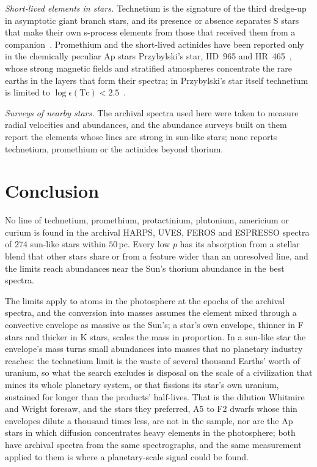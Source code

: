 \documentclass[3p,11pt]{elsarticle}
\begin{document}
\emph{Short-lived elements in stars.} Technetium is the signature of the third dredge-up
in asymptotic giant branch stars, and its presence or absence separates S stars that
make their own s-process elements from those that received them from a
companion~\cite{Merrill1952,VanEckJorissen1999}. Promethium and the short-lived actinides
have been reported only in the chemically peculiar Ap stars Przybylski's star, HD~965 and
HR~465~\cite{Cowley2004,Fivet2007,Gopka2008}, whose strong magnetic fields and
stratified atmospheres concentrate the rare earths in the layers that form their spectra;
in Przybylski's star itself technetium is limited to
$\log\epsilon(\mathrm{Tc})<2.5$~\cite{Andrievsky2023}.

\emph{Surveys of nearby stars.} The archival spectra used here were taken to measure
radial velocities and abundances, and the abundance surveys built on them report the
elements whose lines are strong in sun-like stars; none reports technetium, promethium
or the actinides beyond thorium.

\section{Conclusion}\label{sec:conclusion}

No line of technetium, promethium, protactinium, plutonium, americium or curium is found
in the archival HARPS, UVES, FEROS and ESPRESSO spectra of $274$ sun-like stars within
$50$\,pc. Every low $p$ has its absorption from a stellar blend that other stars share or
from a feature wider than an unresolved line, and the limits reach abundances near the
Sun's thorium abundance in the best spectra.

The limits apply to atoms in the photosphere at the epochs of the archival spectra, and
the conversion into masses assumes the element mixed through a convective envelope as
massive as the Sun's; a star's own envelope, thinner in F stars and thicker in K stars, scales the
mass in proportion. In a sun-like star the envelope's mass turns small abundances into
masses that no planetary industry reaches: the technetium limit is the waste of several
thousand Earths' worth of uranium, so what the search excludes is disposal on the scale
of a civilization that mines its whole planetary system, or that fissions its star's own
uranium, sustained for longer than the products' half-lives. That is the dilution
Whitmire and Wright foresaw, and the stars they preferred, A5 to F2 dwarfs whose thin
envelopes dilute a thousand times less, are not in the sample, nor are the Ap stars in
which diffusion concentrates heavy elements in the photosphere; both have archival
spectra from the same spectrographs, and the same measurement applied to them is where
a planetary-scale signal could be found.
\end{document}

